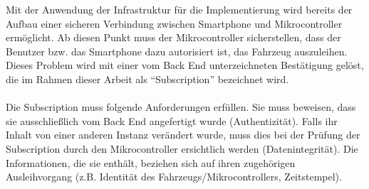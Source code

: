 Mit der Anwendung der Infrastruktur für die Implementierung wird bereits der Aufbau einer sicheren Verbindung zwischen Smartphone und Mikrocontroller ermöglicht. Ab diesen Punkt muss der Mikrocontroller sicherstellen, dass der Benutzer bzw. das Smartphone dazu autorisiert ist, das Fahrzeug auszuleihen. Dieses Problem wird mit einer vom Back End unterzeichneten Bestätigung gelöst, die im Rahmen dieser Arbeit als "`Subscription"' bezeichnet wird.
\\\\
Die Subscription muss folgende Anforderungen erfüllen. Sie muss beweisen, dass sie ausschließlich vom Back End angefertigt wurde (Authentizität). Falls ihr Inhalt von einer anderen Instanz verändert wurde, muss dies bei der Prüfung der Subscription durch den Mikrocontroller ersichtlich werden (Datenintegrität). Die Informationen, die sie enthält, beziehen sich auf ihren zugehörigen Ausleihvorgang (z.B. Identität des Fahrzeugs/Mikrocontrollers, Zeitstempel).